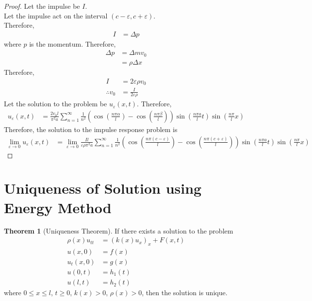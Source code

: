\documentclass[titlepage, fleqn, a4paper, 12pt, twoside]{article}
\theoremstyle{definition}
\theoremstyle{theorem}
\newtheorem{theorem}{Theorem}
\begin{document}
\begin{proof}
	Let the impulse be $I$.\\
	Let the impulse act on the interval $(c - \varepsilon , c + \varepsilon)$.\\
	Therefore,
	\begin{align*}
		I & = \Delta p
	\end{align*}
	where $p$ is the momentum.
	Therefore,
	\begin{align*}
		\Delta p & = \Delta m v_0 \\
                         & = \rho \Delta x
	\end{align*}
	Therefore,
	\begin{align*}
		I              & = 2 \varepsilon \rho v_0 \\
		\therefore v_0 & = \frac{I}{2 \varepsilon \rho}
	\end{align*}
	Let the solution to the problem be $u_{\varepsilon}(x,t)$.
	Therefore,
	\begin{align*}
		u_{\varepsilon}(x,t) & = \frac{2 v_0 l}{\pi^2 a} \sum\limits_{n = 1}^{\infty} \frac{1}{n^2} \left( \cos\left( \frac{n \pi \alpha}{l} \right) - \cos\left( \frac{n \pi \beta}{l} \right) \right) \sin\left( \frac{n \pi a}{l} t \right) \sin\left( \frac{n \pi}{l} x \right)
	\end{align*}
	Therefore, the solution to the impulse response problem is
	\begin{align*}
		\lim\limits_{\varepsilon \to 0} u_{\varepsilon}(x,t) & = \lim\limits_{\varepsilon \to 0} \frac{I l}{\varepsilon \rho \pi^2 a} \sum\limits_{n = 1}^{\infty} \frac{1}{n^2} \left( \cos\left( \frac{n \pi (c - \varepsilon)}{l} \right) - \cos\left( \frac{n \pi (c + \varepsilon)}{l} \right) \right) \sin\left( \frac{n \pi a}{l} t \right) \sin\left( \frac{n \pi}{l} x \right)
	\end{align*}
\end{proof}

\section{Uniqueness of Solution using Energy Method}

\begin{theorem}[Uniqueness Theorem]
	If there exists a solution to the problem
	\begin{align*}
		\rho(x) u_{t t} & = \left( k(x) u_x \right)_x + F(x,t) \\
		u(x,0)          & = f(x)                               \\
		u_t(x,0)        & = g(x)                               \\
		u(0,t)          & = h_1(t)                             \\
		u(l,t)          & = h_2(t)
	\end{align*}
	where $0 \le x \le l$, $t \ge 0$, $k(x) > 0$, $\rho(x) > 0$, then the solution is unique.
	\label{thm:Uniqueness_Theorem}
\end{theorem}
\end{document}
